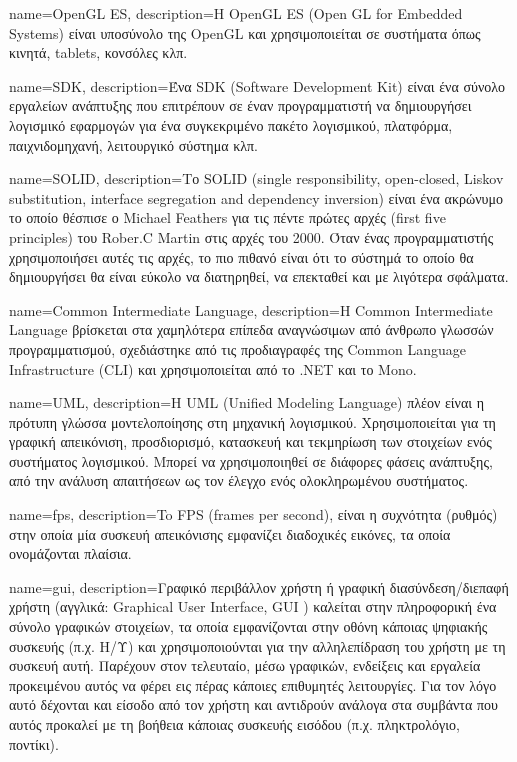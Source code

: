 {
	name=OpenGL ES,
	description={H OpenGL ES (Open GL for Embedded Systems) είναι υποσύνολο της OpenGL και χρησιμοποιείται σε συστήματα όπως κινητά, tablets, κονσόλες κλπ.}
}


{
	name=SDK,
	description={Ένα SDK (Software Development Kit) είναι ένα σύνολο εργαλείων ανάπτυξης που επιτρέπουν σε έναν προγραμματιστή να δημιουργήσει λογισμικό εφαρμογών για ένα συγκεκριμένο πακέτο λογισμικού, πλατφόρμα, παιχνιδομηχανή, λειτουργικό σύστημα κλπ.}
}

{
	name=SOLID,
	description={Το SOLID (single responsibility, open-closed, Liskov substitution, interface segregation and dependency inversion) είναι ένα ακρώνυμο το οποίο θέσπισε ο Michael Feathers για τις πέντε πρώτες αρχές (first five principles) του Rober.C Martin στις αρχές του 2000. Όταν ένας προγραμματιστής χρησιμοποιήσει αυτές τις αρχές, το πιο πιθανό είναι ότι το σύστημά το οποίο θα δημιουργήσει θα είναι εύκολο να διατηρηθεί, να επεκταθεί και με λιγότερα σφάλματα.}
}

{
	name=Common Intermediate Language,
	description={Η Common Intermediate Language βρίσκεται στα χαμηλότερα επίπεδα αναγνώσιμων από άνθρωπο γλωσσών προγραμματισμού, σχεδιάστηκε από τις προδιαγραφές της Common Language Infrastructure (CLI) και χρησιμοποιείται από το .ΝΕΤ και το Μono.}
}

{
	name=UML,
	description={Η UML (Unified Modeling Language) πλέον είναι η πρότυπη γλώσσα μοντελοποίησης στη μηχανική λογισμικού. Χρησιμοποιείται για τη γραφική απεικόνιση, προσδιορισμό, κατασκευή και τεκμηρίωση των στοιχείων ενός συστήματος λογισμικού. Μπορεί να χρησιμοποιηθεί σε διάφορες φάσεις ανάπτυξης, από την ανάλυση απαιτήσεων ως τον έλεγχο ενός ολοκληρωμένου συστήματος.}
}

{
	name={fps},
	description={To FPS (frames per second), είναι η συχνότητα (ρυθμός) στην οποία μία συσκευή απεικόνισης εμφανίζει διαδοχικές εικόνες, τα οποία ονομάζονται πλαίσια.}
}

{
	name={gui},
	description={Γραφικό περιβάλλον χρήστη ή γραφική διασύνδεση/διεπαφή χρήστη (αγγλικά: Graphical User Interface, GUI ) καλείται στην πληροφορική ένα σύνολο γραφικών στοιχείων, τα οποία εμφανίζονται στην οθόνη κάποιας ψηφιακής συσκευής (π.χ. Η/Υ) και χρησιμοποιούνται για την αλληλεπίδραση του χρήστη με τη συσκευή αυτή. Παρέχουν στον τελευταίο, μέσω γραφικών, ενδείξεις και εργαλεία προκειμένου αυτός να φέρει εις πέρας κάποιες επιθυμητές λειτουργίες. Για τον λόγο αυτό δέχονται και είσοδο από τον χρήστη και αντιδρούν ανάλογα στα συμβάντα που αυτός προκαλεί με τη βοήθεια κάποιας συσκευής εισόδου (π.χ. πληκτρολόγιο, ποντίκι).}		
}

